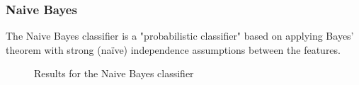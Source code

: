 \subsubsection{Naive Bayes}
The Naive Bayes classifier is a "probabilistic classifier" based on applying Bayes' theorem with strong (naïve) independence assumptions between the features.
\begin{figure}[H]
    \centering
    \caption{Results for the Naive Bayes classifier}
    \label{fig:NBResults}
\end{figure}

